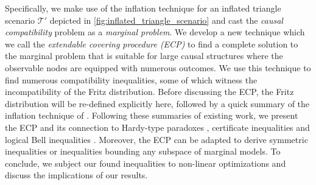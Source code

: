 \documentclass[aps, 10pt, english, twoside, pra, nofootinbib, longbibliography]{revtex4-1}
\theoremstyle{plain}
\theoremstyle{definition}
\theoremstyle{remark}
\newcommand{\ts}{\mathcal{T}}
\begin{document}
    Specifically, we make use of the inflation technique for an inflated triangle scenario $\ts'$ depicted in \cref{fig:inflated_triangle_scenario} and cast the \textit{causal compatibility} problem as a \textit{marginal problem}. We develop a new technique which we call the \textit{extendable covering procedure (ECP)} to find a complete solution to the marginal problem that is suitable for large causal structures where the observable nodes are equipped with numerous outcomes. We use this technique to find numerous compatibility inequalities, some of which witness the incompatibility of the Fritz distribution. Before discussing the ECP, the Fritz distribution will be re-defined explicitly here, followed by a quick summary of the inflation technique of \cite{Inflation}. Following these summaries of existing work, we present the ECP and its connection to Hardy-type paradoxes \cite{Inflation,Liang_2011,Mansfield_2012}, certificate inequalities and logical Bell inequalities \cite{Abramsky_2011}. Moreover, the ECP can be adapted to derive symmetric inequalities or inequalities bounding any subspace of marginal models. To conclude, we subject our found inequalities to non-linear optimizations and discuss the implications of our results.
\end{document}
